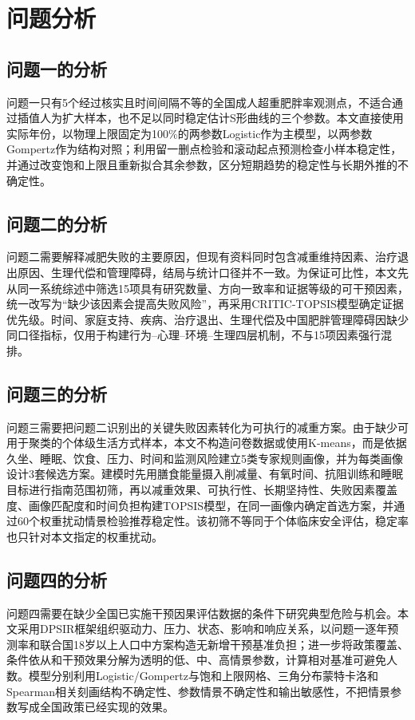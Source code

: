 \section{问题分析}

\subsection{问题一的分析}

问题一只有5个经过核实且时间间隔不等的全国成人超重肥胖率观测点，不适合通过插值人为扩大样本，也不足以同时稳定估计S形曲线的三个参数。本文直接使用实际年份，以物理上限固定为100\%的两参数Logistic作为主模型，以两参数Gompertz作为结构对照；利用留一删点检验和滚动起点预测检查小样本稳定性，并通过改变饱和上限且重新拟合其余参数，区分短期趋势的稳定性与长期外推的不确定性。

\subsection{问题二的分析}

问题二需要解释减肥失败的主要原因，但现有资料同时包含减重维持因素、治疗退出原因、生理代偿和管理障碍，结局与统计口径并不一致。为保证可比性，本文先从同一系统综述中筛选15项具有研究数量、方向一致率和证据等级的可干预因素，统一改写为“缺少该因素会提高失败风险”，再采用CRITIC-TOPSIS模型确定证据优先级。时间、家庭支持、疾病、治疗退出、生理代偿及中国肥胖管理障碍因缺少同口径指标，仅用于构建行为--心理--环境--生理四层机制，不与15项因素强行混排。

\subsection{问题三的分析}

问题三需要把问题二识别出的关键失败因素转化为可执行的减重方案。由于缺少可用于聚类的个体级生活方式样本，本文不构造问卷数据或使用K-means，而是依据久坐、睡眠、饮食、压力、时间和监测风险建立5类专家规则画像，并为每类画像设计3套候选方案。建模时先用膳食能量摄入削减量、有氧时间、抗阻训练和睡眠目标进行指南范围初筛，再以减重效果、可执行性、长期坚持性、失败因素覆盖度、画像匹配度和时间负担构建TOPSIS模型，在同一画像内确定首选方案，并通过60个权重扰动情景检验推荐稳定性。该初筛不等同于个体临床安全评估，稳定率也只针对本文指定的权重扰动。

\subsection{问题四的分析}

问题四需要在缺少全国已实施干预因果评估数据的条件下研究典型危险与机会。本文采用DPSIR框架组织驱动力、压力、状态、影响和响应关系，以问题一逐年预测率和联合国18岁以上人口中方案构造无新增干预基准负担；进一步将政策覆盖、条件依从和干预效果分解为透明的低、中、高情景参数，计算相对基准可避免人数。模型分别利用Logistic/Gompertz与饱和上限网格、三角分布蒙特卡洛和Spearman相关刻画结构不确定性、参数情景不确定性和输出敏感性，不把情景参数写成全国政策已经实现的效果。

